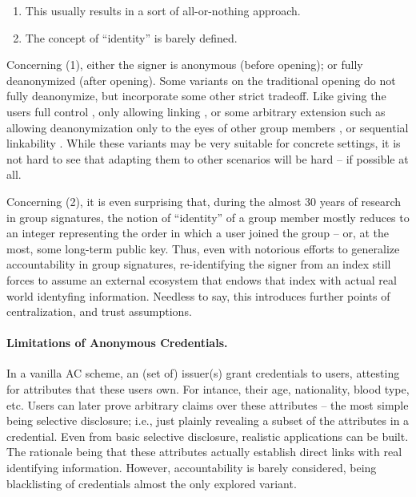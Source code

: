 \begin{enumerate}
\item This usually results in a sort of all-or-nothing approach. 
\item The concept of ``identity'' is barely defined.
\end{enumerate}

Concerning (1), either the signer is anonymous (before opening); or fully
deanonymized (after opening). Some variants on the traditional opening do not
fully deanonymize, but incorporate some other strict tradeoff. Like giving the
users full control \cite{dl21}, only allowing linking \needcite, or some
arbitrary extension such as allowing deanonymization only to the eyes of other
group members \needcite, or sequential linkability \cite{dl21}. While these
variants may be very suitable for concrete settings, it is not hard to see that
adapting them to other scenarios will be hard -- if possible at all.

Concerning (2), it is even surprising that, during the almost 30 years of
research in group signatures, the notion of ``identity'' of a group member
mostly reduces to an integer representing the order in which a user joined
the group -- or, at the most, some long-term public key. Thus, even with
notorious efforts to generalize accountability in group signatures,
re-identifying the signer from an index still forces to assume an external
ecosystem that endows that index with actual real world identyfing information.
Needless to say, this introduces further points of centralization, and
trust assumptions.

\paragraph{Limitations of Anonymous Credentials.} %
In a vanilla AC scheme, an (set of) issuer(s) grant credentials to users,
attesting for attributes that these users own. For intance, their age,
nationality, blood type, etc. Users can later prove arbitrary claims over
these attributes -- the most simple being selective disclosure; i.e., just
plainly revealing a subset of the attributes in a credential. Even from basic
selective disclosure, realistic applications can be built. The rationale being
that these attributes actually establish direct links with real identifying
information. However, accountability is barely considered, being blacklisting
of credentials almost the only explored variant.

